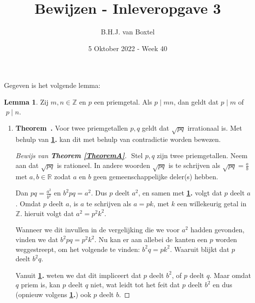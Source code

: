 \documentclass[12pt, dutch, a4paper]{article}
\theoremstyle{definition}
\newtheorem{lemmalos}{Lemma}
\newenvironment{shortthm}
  {\refstepcounter{theorem}\textbf{Theorem~\thetheorem.}}%
{\enskip}
\begin{document}
\title{Bewijzen - Inleveropgave 3}
\author{B.H.J. van Boxtel}
\date{5 Oktober 2022 - Week 40} 

\maketitle
{} 

Gegeven is het volgende lemma:
\begin{lemmalos}\label{lemma1}
    Zij $m,n \in \mathbb{Z}$ en $p$ een priemgetal. Als $p \mid mn$, 
    dan geldt dat $p \mid m$ of $\; p \mid n$.
\end{lemmalos}

\begin{enumerate}[(a.)]
    \item
    \begin{shortthm}\label{TheoremA}
        Voor twee priemgetallen $p,q$ geldt dat $\sqrt{pq}$ irrationaal is.
    \end{shortthm}
    Met behulp van \textbf{\cref{lemma1}.} kan dit met behulp van contradictie worden bewezen.
    \begin{proof}[Bewijs van \textbf{Theorem \ref{TheoremA}}] $ $ \newline
        Stel $p,q$ zijn twee priemgetallen. \newline
        Neem aan dat $\sqrt{pq}$ is rationeel.
        In andere woorden $\sqrt{pq}$ is te schrijven als $\sqrt{pq} = \tfrac{a}{b}$ 
        met $a,b \in \mathbb{R}$ zodat $a$ en $b$ geen gemeenschappelijke deler(s) hebben.

        Dan $pq = \tfrac{a^2}{b^2}$ en $b^2pq = a^2$. \newline
        Dus $p$ deelt $a^2$, 
        en samen met \textbf{\cref{lemma1}.} volgt dat $p$ deelt $a$. \newline 
        Omdat $p$ deelt $a$, is $a$ te schrijven als 
        $a = pk$, met $k$ een willekeurig getal in $\mathbb{Z}$.
        hieruit volgt dat $a^2 = p^2k^2$.

        Wanneer we dit invullen in de vergelijking die we voor $a^2$ hadden gevonden, 
        vinden we dat $b^2pq = p^2k^2$. 
        Nu kan er aan allebei de kanten een $p$ worden weggestreept, 
        om het volgende te vinden: $b^2q = pk^2$. Waaruit blijkt dat $p$ deelt $b^2q$.

        Vanuit \textbf{\cref{lemma1}.} weten we dat dit impliceert dat $p$ deelt $b^2$, 
        of $p$ deelt $q$. Maar omdat $q$ priem is, kan $p$ deelt $q$ niet,
        wat leidt tot het feit dat $p$ deelt $b^2$ 
        en dus (opnieuw volgens \textbf{\cref{lemma1}.}) ook $p$ deelt $b$.


\end{proof}
\end{enumerate}
\end{document}
